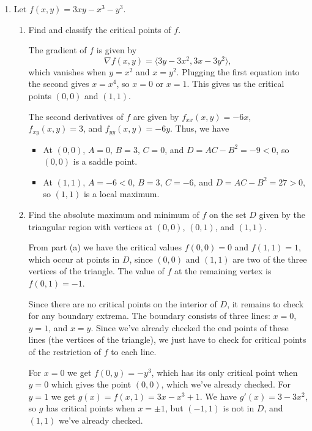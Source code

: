 \documentclass[12pt]{article}
\newcommand{\points}[1]{\marginpar{\hspace{24pt}[#1]}}
\begin{document}
\begin{enumerate}
\begin{enumerate}
\end{enumerate}
\newpage

\item Let $f(x,y) = 3xy-x^3-y^3$.
\begin{enumerate}
\item Find and classify the critical points of $f$. \points{8}

\bigskip

The gradient of $f$ is given by
\[
\nabla f(x,y) = \langle 3y-3x^2,3x-3y^2\rangle,
\]
which vanishes when $y=x^2$ and $x=y^2$. Plugging the first equation into the second gives $x=x^4$, so $x=0$ or $x=1$. This gives us the critical points $(0,0)$ and $(1,1)$.

The second derivatives of $f$ are given by $f_{xx}(x,y) = -6x$, $f_{xy}(x,y) = 3$, and $f_{yy}(x,y) = -6y$. Thus, we have
\begin{itemize}
\item At $(0,0)$, $A=0, \, B= 3,\, C=0$, and $D = AC-B^2=-9<0$, so $(0,0)$ is a saddle point.
\item At $(1,1)$, $A=-6<0,\, B=3,\, C=-6$, and $D = AC-B^2 = 27>0$, so $(1,1)$ is a local maximum.
\end{itemize}

\bigskip

\item Find the absolute maximum and minimum of $f$ on the set $D$ given by the triangular region with vertices at $(0,0)$, $(0,1)$, and $(1,1)$. \points{7}

\bigskip

From part (a) we have the critical values $f(0,0)=0$ and $f(1,1) = 1$, which occur at points in $D$, since $(0,0)$ and $(1,1)$ are two of the three vertices of the triangle. The value of $f$ at the remaining vertex is $f(0,1) = -1$.

Since there are no critical points on the interior of $D$, it remains to check for any boundary extrema. The boundary consists of three lines: $x=0$, $y=1$, and $x=y$. Since we've already checked the end points of these lines (the vertices of the triangle), we just have to check for critical points of the restriction of $f$ to each line.

For $x=0$ we get $f(0,y) = -y^3$, which has its only critical point when $y=0$ which gives the point $(0,0)$, which we've already checked. For $y=1$ we get $g(x) = f(x,1) = 3x-x^3+1$. We have $g'(x) = 3-3x^2$, so $g$ has critical points when $x=\pm 1$, but $(-1,1)$ is not in $D$, and $(1,1)$ we've already checked.


\end{enumerate}
\end{enumerate}
\end{document}
